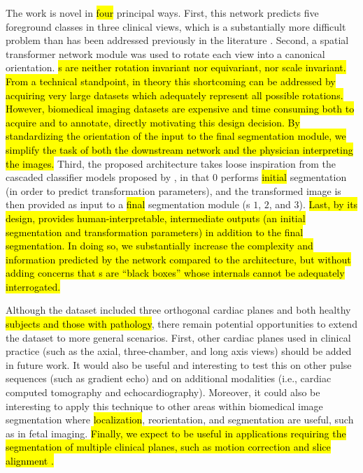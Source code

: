The work is novel in \hl{four} principal ways.
First, this network predicts five foreground classes in three clinical views, which is a substantially more difficult problem than has been addressed previously in the literature \citep{Vigneault2017}.
Second, a spatial transformer network module \citep{Jaderberg2015} was used to rotate each view into a canonical orientation.
\hl{
\CNN{}s are neither rotation invariant nor equivariant, nor scale invariant.
From a technical standpoint, in theory this shortcoming can be addressed by acquiring very large datasets which adequately represent all possible rotations.
However, biomedical imaging datasets are expensive and time consuming both to acquire and to annotate, directly motivating this design decision.
By standardizing the orientation of the input to the \hl{final} segmentation module, we simplify the task of both the downstream network and the physician interpreting the images.}
Third, the proposed architecture takes loose inspiration from the cascaded classifier models proposed by \citet{Viola2001}, in that \UNet{} $0$ performs \hl{initial} segmentation (in order to predict transformation parameters), and the transformed image is then provided as input to a \hl{final} segmentation module (\UNet{}s $1$, $2$, and $3$).
\hl{
Last, by its design, \omeganet{} provides human-interpretable, intermediate outputs (an \hl{initial} segmentation and transformation parameters) in addition to the \hl{final} segmentation.
In doing so, we substantially increase the complexity and information predicted by the network compared to the \UNet{} architecture, but without adding concerns that \CNN{}s are ``black boxes'' whose internals cannot be adequately interrogated.
}

Although the dataset included three orthogonal cardiac planes and both healthy \hl{subjects and those with \LV{} pathology}, there remain potential opportunities to extend the dataset to more general scenarios.
First, other cardiac planes used in clinical practice (such as the axial, three-chamber, and \RV{} long axis views) should be added in future work.
It would also be useful and interesting to test this on other \CMR{} pulse sequences (such as gradient echo) and on additional modalities (i.e., cardiac computed tomography and echocardiography).
Moreover, it could also be interesting to apply this technique to other areas within biomedical image segmentation where \hl{localization}, reorientation, and segmentation are useful, such as in fetal imaging.
\hl{
Finally, we expect \omeganet{} to be useful in applications requiring the segmentation of multiple clinical planes, such as \CMR{} motion correction and slice alignment \citep{Sinclair2017}.
}

